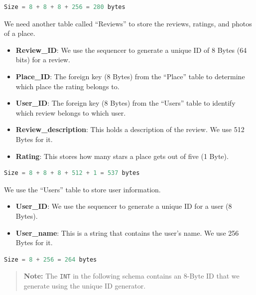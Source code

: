 \begin{lstlisting}[language=JavaScript]
Size = 8 + 8 + 8 + 256 = 280 bytes
\end{lstlisting}

We need another table called ``Reviews'' to store the reviews, ratings, and photos of a place.

\begin{itemize}
\item
\protect{}\label{NkA4pfgIDzd47o1DAUMV7}
\textbf{Review\_ID}: We use the sequencer to generate a unique ID of 8 Bytes (64 bits) for a review.
\item
\protect{}\label{Ysvt-RlT5P2zIzdn1NMBr}
\textbf{Place\_ID}: The foreign key (8 Bytes) from the ``Place'' table to determine which place the rating belongs to.
\item
\protect{}\label{hGmiUH7Bf3Etq_PQgEIEQ}
\textbf{User\_ID}: The foreign key (8 Bytes) from the ``Users'' table to identify which review belongs to which user.
\item
\protect{}\label{0xe3evyDJSrduK064PQSj}
\textbf{Review\_description}: This holds a description of the review. We use 512 Bytes for it.
\item
\protect{}\label{6y_voqgVKgVXaKUJdysF2}
\textbf{Rating}: This stores how many stars a place gets out of five (1 Byte).
\end{itemize}

\begin{lstlisting}[language=JavaScript]
Size = 8 + 8 + 8 + 512 + 1 = 537 bytes
\end{lstlisting}

We use the ``Users'' table to store user information.

\begin{itemize}
\item
\protect{}\label{tPfeRttSayXFLIamV-nVl}
\textbf{User\_ID}: We use the sequencer to generate a unique ID for a user (8 Bytes).
\item
\protect{}\label{_Jh6tRLOjmcUqOBHE7Lgt}
\textbf{User\_name}: This is a string that contains the user's name. We use 256 Bytes for it.
\end{itemize}

\begin{lstlisting}[language=JavaScript]
Size = 8 + 256 = 264 bytes
\end{lstlisting}

\begin{quote}
\textbf{Note:} The \texttt{INT} in the following schema contains an 8-Byte ID that we generate using the unique ID generator.
\end{quote}

